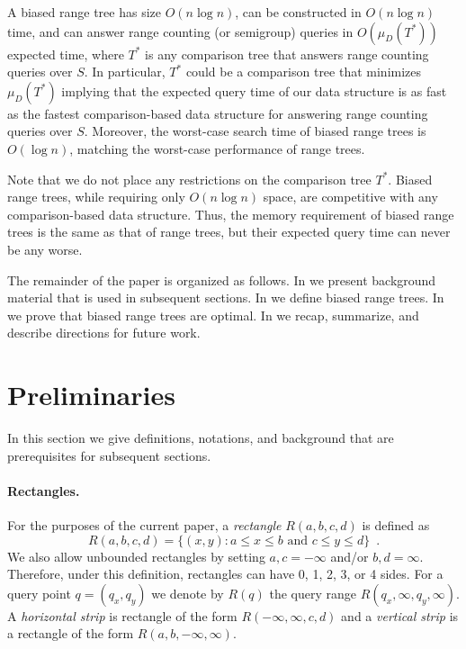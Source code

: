 \documentclass[charterfonts]{patmorin}
\begin{document}
A biased range tree has size $O(n\log n)$, can be constructed in
$O(n\log n)$ time, and can answer range counting (or semigroup)
queries in $O(\mu_D(T^*))$ expected time, where $T^*$ is any
comparison tree that answers range counting queries over $S$.  In
particular, $T^*$ could be a comparison tree that minimizes
$\mu_D(T^*)$ implying that the expected query time of our data
structure is as fast as the fastest comparison-based data structure
for answering range counting queries over $S$.  Moreover, the
worst-case search time of biased range trees is $O(\log n)$, matching
the worst-case performance of range trees.

Note that we do not place any restrictions on the comparison tree $T^*$.
Biased range trees, while requiring only $O(n\log n)$ space, are
competitive with any comparison-based data structure.  Thus, the memory
requirement of biased range trees is the same as that of range trees, but
their expected query time can never be any worse.
 
The remainder of the paper is organized as follows. In
 we present background material that is used in
subsequent sections.  In  we define biased
range trees. In  we prove that biased range trees
are optimal.  In  we recap, summarize, and describe
directions for future work.

\section{Preliminaries}


In this section we give definitions, notations, and background
that are prerequisites for subsequent sections.

\paragraph{Rectangles.}

For the purposes of the current paper, a \emph{rectangle}
$R(a,b,c,d)$ is defined as
\[
    R(a,b,c,d) = \{ (x,y) : \mbox{$a\le  x \le b$ and $c \le y \le d$}\}
	\enspace .
\]
We also allow unbounded rectangles by setting $a,c=-\infty$ and/or
$b,d=\infty$.  Therefore, under this definition, rectangles can have
0, 1, 2, 3, or 4 sides.  For a query point $q=(q_x,q_y)$ we denote 
by $R(q)$ the query range $R(q_x,\infty,q_y,\infty)$.  A
\emph{horizontal strip} is rectangle of the form
$R(-\infty,\infty,c,d)$ and a \emph{vertical strip} is a rectangle of
the form $R(a,b,-\infty,\infty)$.
\end{document}
